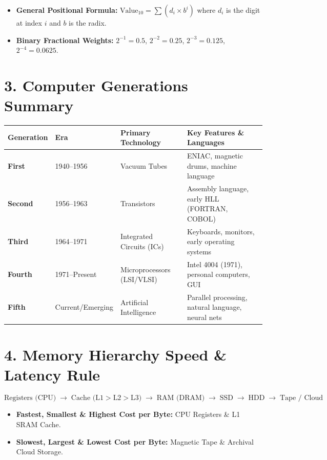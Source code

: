 \begin{itemize}[leftmargin=6mm]
    \item \textbf{General Positional Formula:} $\text{Value}_{10} = \sum (d_i \times b^i)$ where $d_i$ is the digit at index $i$ and $b$ is the radix.
    \item \textbf{Binary Fractional Weights:} $2^{-1} = 0.5$, $2^{-2} = 0.25$, $2^{-3} = 0.125$, $2^{-4} = 0.0625$.
\end{itemize}

\section*{3. Computer Generations Summary}
\begin{center}
\renewcommand{\arraystretch}{1.25}
\begin{tabular}{l l l p{6.5cm}}
\toprule
\textbf{Generation} & \textbf{Era} & \textbf{Primary Technology} & \textbf{Key Features \& Languages} \\
\midrule
\textbf{First} & 1940--1956 & Vacuum Tubes & ENIAC, magnetic drums, machine language \\
\textbf{Second} & 1956--1963 & Transistors & Assembly language, early HLL (FORTRAN, COBOL) \\
\textbf{Third} & 1964--1971 & Integrated Circuits (ICs) & Keyboards, monitors, early operating systems \\
\textbf{Fourth} & 1971--Present & Microprocessors (LSI/VLSI) & Intel 4004 (1971), personal computers, GUI \\
\textbf{Fifth} & Current/Emerging & Artificial Intelligence & Parallel processing, natural language, neural nets \\
\bottomrule
\end{tabular}
\end{center}

\section*{4. Memory Hierarchy Speed \& Latency Rule}
\[
\text{Registers (CPU)} \;\longrightarrow\; \text{Cache (L1} > \text{L2} > \text{L3)} \;\longrightarrow\; \text{RAM (DRAM)} \;\longrightarrow\; \text{SSD} \;\longrightarrow\; \text{HDD} \;\longrightarrow\; \text{Tape / Cloud}
\]
\begin{itemize}[leftmargin=6mm]
    \item \textbf{Fastest, Smallest \& Highest Cost per Byte:} CPU Registers \& L1 SRAM Cache.
    \item \textbf{Slowest, Largest \& Lowest Cost per Byte:} Magnetic Tape \& Archival Cloud Storage.
\end{itemize}

